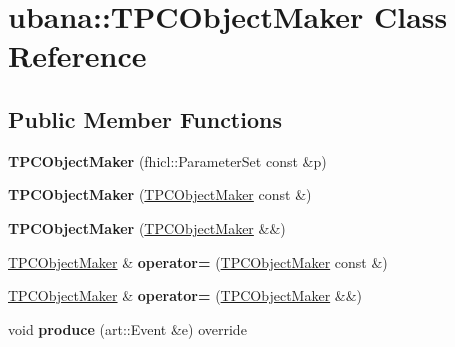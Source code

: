 \hypertarget{classubana_1_1TPCObjectMaker}{\section{ubana\-:\-:\-T\-P\-C\-Object\-Maker \-Class \-Reference}
\label{classubana_1_1TPCObjectMaker}
}
\subsection*{\-Public \-Member \-Functions}
\begin{DoxyCompactItemize}
\item 
\hypertarget{group__UBXSec_gae030804e6aa4085bef6be52e9618fee9}{{\bfseries \-T\-P\-C\-Object\-Maker} (fhicl\-::\-Parameter\-Set const \&p)}\label{group__UBXSec_gae030804e6aa4085bef6be52e9618fee9}

\item 
\hypertarget{classubana_1_1TPCObjectMaker_a80b650974869e7c488654573955c7d9f}{{\bfseries \-T\-P\-C\-Object\-Maker} (\hyperlink{classubana_1_1TPCObjectMaker}{\-T\-P\-C\-Object\-Maker} const \&)}\label{classubana_1_1TPCObjectMaker_a80b650974869e7c488654573955c7d9f}

\item 
\hypertarget{classubana_1_1TPCObjectMaker_a94412d90dd82b0c1974ce2d5ff746aec}{{\bfseries \-T\-P\-C\-Object\-Maker} (\hyperlink{classubana_1_1TPCObjectMaker}{\-T\-P\-C\-Object\-Maker} \&\&)}\label{classubana_1_1TPCObjectMaker_a94412d90dd82b0c1974ce2d5ff746aec}

\item 
\hypertarget{classubana_1_1TPCObjectMaker_af87f91bc15450c410f21b2fef5c87c7b}{\hyperlink{classubana_1_1TPCObjectMaker}{\-T\-P\-C\-Object\-Maker} \& {\bfseries operator=} (\hyperlink{classubana_1_1TPCObjectMaker}{\-T\-P\-C\-Object\-Maker} const \&)}\label{classubana_1_1TPCObjectMaker_af87f91bc15450c410f21b2fef5c87c7b}

\item 
\hypertarget{classubana_1_1TPCObjectMaker_a949a6f5fe1f6ee0519ad0e550aa47dc8}{\hyperlink{classubana_1_1TPCObjectMaker}{\-T\-P\-C\-Object\-Maker} \& {\bfseries operator=} (\hyperlink{classubana_1_1TPCObjectMaker}{\-T\-P\-C\-Object\-Maker} \&\&)}\label{classubana_1_1TPCObjectMaker_a949a6f5fe1f6ee0519ad0e550aa47dc8}

\item 
\hypertarget{group__UBXSec_ga07c03a811bbaccdbeb20b2b7714034c9}{void {\bfseries produce} (art\-::\-Event \&e) override}\label{group__UBXSec_ga07c03a811bbaccdbeb20b2b7714034c9}


\end{DoxyCompactItemize}
